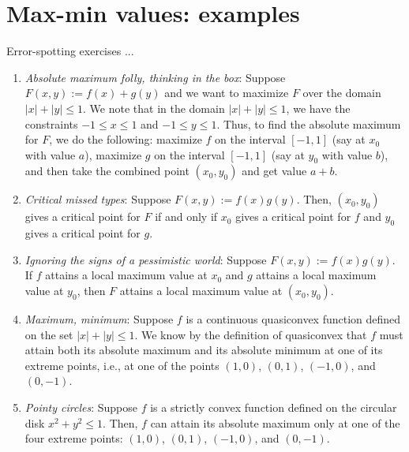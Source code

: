 \documentclass[10pt]{amsart}
\begin{document}
\section{Max-min values: examples}

Error-spotting exercises ...

\begin{enumerate}
\item {\em Absolute maximum folly, thinking in the box}: Suppose
  $F(x,y) := f(x) + g(y)$ and we want to maximize $F$ over the domain
  $|x| + |y| \le 1$. We note that in the domain $|x| + |y| \le 1$, we
  have the constraints $-1 \le x \le 1$ and $-1 \le y \le 1$. Thus, to
  find the absolute maximum for $F$, we do the following: maximize $f$
  on the interval $[-1,1]$ (say at $x_0$ with value $a$), maximize $g$
  on the interval $[-1,1]$ (say at $y_0$ with value $b$), and then
  take the combined point $(x_0,y_0)$ and get value $a + b$.
\item {\em Critical missed types}: Suppose $F(x,y) := f(x)g(y)$. Then,
  $(x_0,y_0)$ gives a critical point for $F$ if and only if $x_0$
  gives a critical point for $f$ and $y_0$ gives a critical point for
  $g$.
\item {\em Ignoring the signs of a pessimistic world}: Suppose $F(x,y)
  := f(x)g(y)$. If $f$ attains a local maximum value at $x_0$ and $g$
  attains a local maximum value at $y_0$, then $F$ attains a local
  maximum value at $(x_0,y_0)$.
\item {\em Maximum, minimum}: Suppose $f$ is a continuous quasiconvex
  function defined on the set $|x| + |y| \le 1$. We know by the
  definition of quasiconvex that $f$ must attain both its absolute
  maximum and its absolute minimum at one of its extreme points, i.e.,
  at one of the points $(1,0)$, $(0,1)$, $(-1,0)$, and $(0,-1)$.
\item {\em Pointy circles}: Suppose $f$ is a strictly convex function
  defined on the circular disk $x^2 + y^2 \le 1$. Then, $f$ can attain
  its absolute maximum only at one of the four extreme points:
  $(1,0)$, $(0,1)$, $(-1,0)$, and $(0,-1)$.
\end{enumerate}
\end{document}
